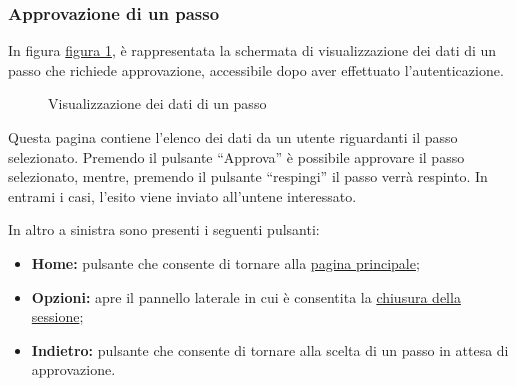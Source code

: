 \subsubsection{Approvazione di un passo}

In figura \hyperref[fig:Fapprove]{figura \ref{fig:Fapprove}}, è rappresentata la schermata di visualizzazione dei dati di un passo che richiede approvazione, accessibile dopo aver effettuato l'autenticazione.

\begin{figure}[H] \centering 
{} \caption{Visualizzazione dei dati di un passo}
\label{fig:Fapprove}
\end{figure}

Questa pagina contiene l'elenco dei dati da un utente riguardanti il passo selezionato. 
Premendo il pulsante ``Approva'' è possibile approvare il passo selezionato, mentre, premendo il pulsante ``respingi'' il passo verrà respinto. In entrami i casi, l'esito viene inviato all'untene interessato.

In altro a sinistra sono presenti i seguenti pulsanti:
\begin{itemize}
\item \textbf{Home:} pulsante che consente di tornare alla \hyperref[home]{pagina principale};
\item \textbf{Opzioni:} apre il pannello laterale in cui è consentita la \hyperref[logout]{chiusura della sessione};
\item \textbf{Indietro:} pulsante che consente di tornare alla scelta di un passo in attesa di approvazione.
\end{itemize}

